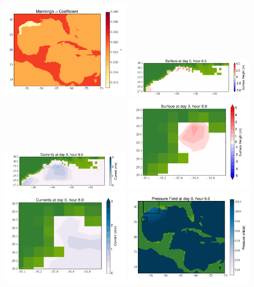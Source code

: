 \documentclass[11pt]{article}
\begin{document}
\vskip 10pt 
\includegraphics[width=0.475\textwidth]{frame0078fig3.png}
\includegraphics[width=0.475\textwidth]{frame0078fig4.png}
\vskip 10pt 
\includegraphics[width=0.475\textwidth]{frame0078fig5.png}
\includegraphics[width=0.475\textwidth]{frame0078fig6.png}
\vskip 10pt 
\includegraphics[width=0.475\textwidth]{frame0078fig7.png}
\includegraphics[width=0.475\textwidth]{frame0078fig8.png}
\end{document}
